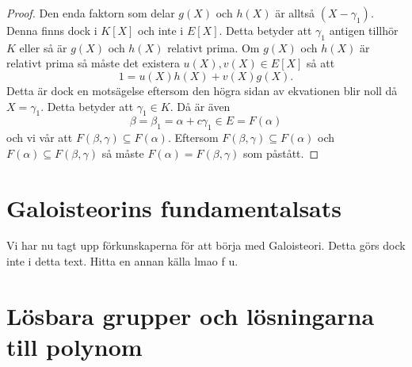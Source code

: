 \documentclass{article}
\theoremstyle{definition}
\begin{document}
\begin{proof}
  Den enda faktorn som delar $g(X)$ och $h(X)$ är alltså $(X - \gamma_1)$. Denna finns dock i $K[X]$ och inte i $E[X]$. Detta betyder att 
  $\gamma_1$ antigen tillhör $K$ eller så är $g(X)$ och $h(X)$ relativt prima. Om $g(X)$ och $h(X)$ är relativt prima så måste 
  det existera $u(X), v(X) \in E[X]$ så att
  \[1 = u(X)h(X) + v(X)g(X).\]
  Detta är dock en motsägelse eftersom den högra sidan av ekvationen blir noll då $X = \gamma_1.$ Detta betyder att $\gamma_1 \in K.$ Då är även 
  \[\beta = \beta_1 = \alpha + c\gamma_1 \in E = F(\alpha)\]
  och vi vår att $F(\beta, \gamma) \subseteq F(\alpha)$. Eftersom $F(\beta, \gamma) \subseteq F(\alpha)$ och $F(\alpha) \subseteq F(\beta, \gamma)$
  så måste $F(\alpha) = F(\beta, \gamma)$ som påstått.
\end{proof}

\section{Galoisteorins fundamentalsats}
Vi har nu tagt upp förkunskaperna för att börja med Galoisteori. Detta görs dock inte i detta text. Hitta en annan källa lmao f u.
\section{Lösbara grupper och lösningarna till polynom}
\end{document}
